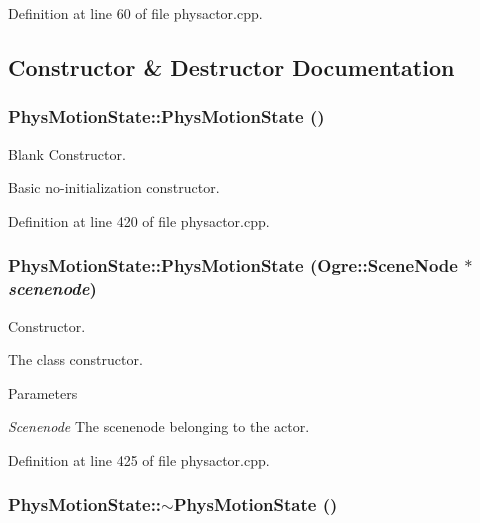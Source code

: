 Definition at line 60 of file physactor.cpp.



\subsection{Constructor \& Destructor Documentation}
\hypertarget{classPhysMotionState_a8439c3835b9d96b0b1b285126df41a42}{
\subsubsection[{PhysMotionState}]{\setlength{\rightskip}{0pt plus 5cm}PhysMotionState::PhysMotionState ()}}
\label{d2/d14/classPhysMotionState_a8439c3835b9d96b0b1b285126df41a42}


Blank Constructor. 

Basic no-\/initialization constructor. 

Definition at line 420 of file physactor.cpp.

\hypertarget{classPhysMotionState_a9c315b85bc405a36a6bd9d9a9f68c34a}{
\subsubsection[{PhysMotionState}]{\setlength{\rightskip}{0pt plus 5cm}PhysMotionState::PhysMotionState (Ogre::SceneNode $\ast$ {\em scenenode})}}
\label{d2/d14/classPhysMotionState_a9c315b85bc405a36a6bd9d9a9f68c34a}


Constructor. 

The class constructor. 
\begin{DoxyParams}{Parameters}
\item[{\em Scenenode}]The scenenode belonging to the actor. \end{DoxyParams}


Definition at line 425 of file physactor.cpp.

\hypertarget{classPhysMotionState_a74441aa0ba9a1b99ee1662b2eee9db3c}{
\subsubsection[{$\sim$PhysMotionState}]{\setlength{\rightskip}{0pt plus 5cm}PhysMotionState::$\sim$PhysMotionState ()}}
\label{d2/d14/classPhysMotionState_a74441aa0ba9a1b99ee1662b2eee9db3c}


